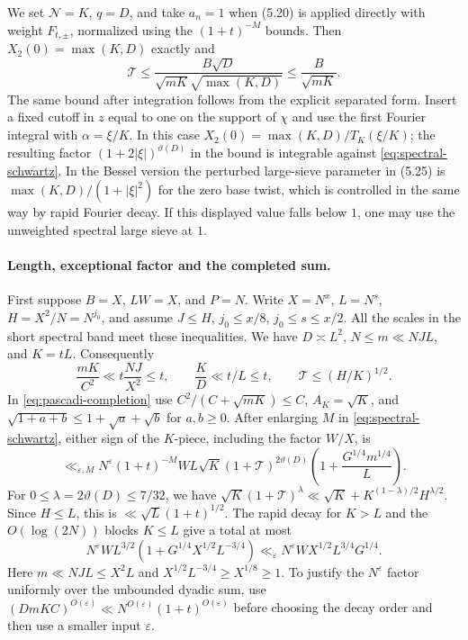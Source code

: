 \documentclass[11pt]{amsart}
\numberwithin{equation}{section}
\theoremstyle{remark}
\begin{document}
We set \(\mathcal N=K\), \(q=D\), and take \(a_n=1\) when (5.20)
is applied directly with weight \(F_{t,\pm}\), normalized using the
\((1+t)^{-M}\) bounds. Then \(X_2(0)=\max(K,D)\) exactly and
\begin{equation}
 \mathcal T\le\frac{B\sqrt D}{\sqrt{mK}\sqrt{\max(K,D)}}
              \le\frac{B}{\sqrt{mK}}.
 \label{eq:spectral-level-cancellation}
\end{equation}
The same bound after integration follows from the explicit separated
form. Insert a fixed cutoff in \(z\) equal to one on the support of
\(\chi\) and use the first Fourier integral with
\(\alpha=\xi/K\). In this case
\(X_2(0)=\max(K,D)/T_K(\xi/K)\); the resulting factor
\((1+2|\xi|)^{\vartheta(D)}\) in the bound is integrable against
\eqref{eq:spectral-schwartz}. In the Bessel version the perturbed
large-sieve parameter in (5.25) is
\(\max(K,D)/(1+|\xi|^2)\) for the zero base twist, which is
controlled in the same way by rapid Fourier decay. If this displayed
value falls below \(1\), one may use the unweighted spectral large
sieve at \(1\).

\paragraph{Length, exceptional factor and the completed sum.}
First suppose \(B=X\), \(LW=X\), and \(P=N\).
Write \(X=N^x\), \(L=N^s\), \(H=X^2/N=N^{j_0}\), and assume
\(J\le H\), \(j_0\le x/8\), \(j_0\le s\le x/2\).
All the scales in the short spectral band meet these inequalities.
We have \(D\asymp L^2\), \(N\le m\ll NJL\), and \(K=tL\).
Consequently
\[
 \frac{mK}{C^2}\ll t\frac{NJ}{X^2}\le t,\qquad
 \frac KD\ll t/L\le t,\qquad
 \mathcal T\le (H/K)^{1/2}.
\]
In \eqref{eq:pascadi-completion} use
\(C^2/(C+\sqrt{mK})\le C\), \(A_K=\sqrt K\), and
\(\sqrt{1+a+b}\le 1+\sqrt a+\sqrt b\) for \(a,b\ge0\).
After enlarging \(M\) in \eqref{eq:spectral-schwartz}, either sign
of the \(K\)-piece, including the factor \(W/X\), is
\begin{equation}
 \ll_{\varepsilon,M} N^\varepsilon(1+t)^{-M}
 W L \sqrt K(1+\mathcal T)^{2\vartheta(D)}
 \left(1+\frac{G^{1/4}m^{1/4}}{L}\right).
 \label{eq:spectral-piece}
\end{equation}
For \(0\le\lambda=2\vartheta(D)\le7/32\), we have
\(\sqrt K(1+\mathcal T)^\lambda\ll
\sqrt K+K^{(1-\lambda)/2}H^{\lambda/2}\).
Since \(H\le L\), this is
\(\ll\sqrt L(1+t)^{1/2}\). The rapid decay for \(K>L\)
and the \(O(\log(2N))\) blocks \(K\le L\) give a total at most
\begin{equation}
 N^\varepsilon W L^{3/2}
       \left(1+G^{1/4}X^{1/2}L^{-3/4}\right)
 \ll_\varepsilon N^\varepsilon W X^{1/2}L^{3/4}G^{1/4}.
 \label{eq:spectral-fixed-tuple}
\end{equation}
Here \(m\ll NJL\le X^2 L\) and \(X^{1/2}L^{-3/4}\ge X^{1/8}\ge1\).
To justify the \(N^\varepsilon\) factor uniformly over the unbounded
dyadic sum, use \((D m K C)^{O(\varepsilon)}
\ll N^{O(\varepsilon)}(1+t)^{O(\varepsilon)}\) before choosing the
decay order and then use a smaller input \(\varepsilon\).
\end{document}
